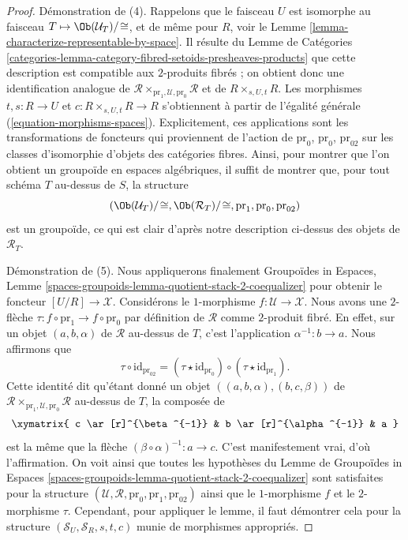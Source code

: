 \begin{proof}
\medskip\noindent
Démonstration de (4). Rappelons que le faisceau $U$ est isomorphe au faisceau
$T \mapsto \Ob(\mathcal{U}_T)/\!\cong$, et
de même pour $R$, voir le
Lemme \ref{lemma-characterize-representable-by-space}.
Il résulte du
Lemme de Catégories
\ref{categories-lemma-category-fibred-setoids-presheaves-products}
que cette description est compatible aux $2$-produits fibrés ;
on obtient donc une identification analogue de
$\mathcal{R} \times_{\text{pr}_1, \mathcal{U}, \text{pr}_0} \mathcal{R}$
et de $R \times_{s, U, t} R$.
Les morphismes $t, s : R \to U$ et $c : R \times_{s, U, t} R \to R$
s'obtiennent à partir de l'égalité générale (\ref{equation-morphisms-spaces}).
Explicitement, ces applications sont les transformations de foncteurs qui proviennent
de l'action de $\text{pr}_0$, $\text{pr}_0$, $\text{pr}_{02}$
sur les classes d'isomorphie d'objets des catégories fibres.
Ainsi, pour montrer que l'on obtient un groupoïde en espaces
algébriques, il suffit de montrer que, pour tout schéma $T$ au-dessus de $S$,
la structure
$$
(\Ob(\mathcal{U}_T)/\!\cong,
\Ob(\mathcal{R}_T)/\!\cong,
\text{pr}_1, \text{pr}_0, \text{pr}_{02})
$$
est un groupoïde, ce qui est clair d'après notre description ci-dessus des objets de
$\mathcal{R}_T$.

\medskip\noindent
Démonstration de (5). Nous appliquerons finalement
Groupoïdes in Espaces,
Lemme \ref{spaces-groupoids-lemma-quotient-stack-2-coequalizer}
pour obtenir le foncteur $[U/R] \to \mathcal{X}$.
Considérons le $1$-morphisme $f : \mathcal{U} \to \mathcal{X}$.
Nous avons une $2$-flèche $\tau : f \circ \text{pr}_1 \to f \circ \text{pr}_0$
par définition de $\mathcal{R}$ comme $2$-produit fibré.
En effet, sur un objet $(a, b, \alpha)$ de $\mathcal{R}$ au-dessus de $T$, c'est
l'application $\alpha^{-1} : b \to a$. Nous affirmons que
$$
\tau \circ \text{id}_{\text{pr}_{02}} =
(\tau \star \text{id}_{\text{pr}_0})
\circ
(\tau \star \text{id}_{\text{pr}_1}).
$$
Cette identité dit qu'étant donné un objet
$((a, b, \alpha), (b, c, \beta))$ de
$\mathcal{R} \times_{\text{pr}_1, \mathcal{U}, \text{pr}_0} \mathcal{R}$
au-dessus de $T$, la composée de
$$
\xymatrix{
c \ar[r]^{\beta^{-1}} & b \ar[r]^{\alpha^{-1}} & a
}
$$
est la même que la flèche $(\beta \circ \alpha)^{-1} : a \to c$. C'est
manifestement vrai, d'où l'affirmation. On voit ainsi que toutes les
hypothèses du
Lemme de Groupoïdes in Espaces
\ref{spaces-groupoids-lemma-quotient-stack-2-coequalizer}
sont satisfaites pour la structure
$(\mathcal{U}, \mathcal{R}, \text{pr}_0, \text{pr}_1, \text{pr}_{02})$
ainsi que le $1$-morphisme $f$ et le $2$-morphisme $\tau$.
Cependant, pour appliquer le lemme, il faut démontrer cela
pour la structure $(\mathcal{S}_U, \mathcal{S}_R, s, t, c)$
munie de morphismes appropriés.


\end{proof}
